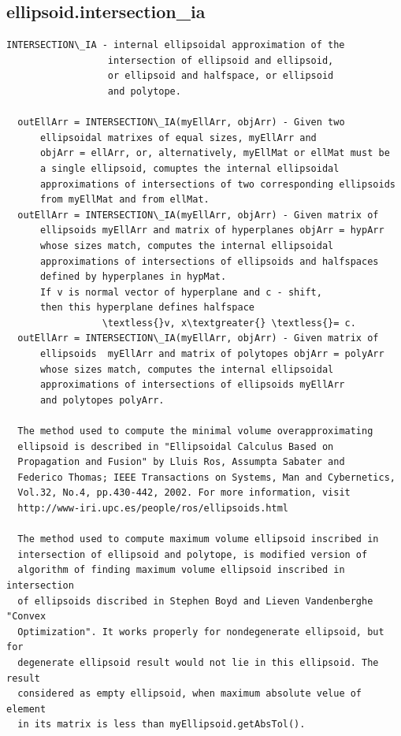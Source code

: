 \documentclass[letterpaper,10pt,english]{sphinxmanual}
\begin{document}
\subsection{ellipsoid.intersection\_ia}
\label{chap_functions:ellipsoid-intersection-ia}
\begin{Verbatim}[commandchars=\\\{\}]
INTERSECTION\_IA - internal ellipsoidal approximation of the
                  intersection of ellipsoid and ellipsoid,
                  or ellipsoid and halfspace, or ellipsoid
                  and polytope.

  outEllArr = INTERSECTION\_IA(myEllArr, objArr) - Given two
      ellipsoidal matrixes of equal sizes, myEllArr and
      objArr = ellArr, or, alternatively, myEllMat or ellMat must be
      a single ellipsoid, comuptes the internal ellipsoidal
      approximations of intersections of two corresponding ellipsoids
      from myEllMat and from ellMat.
  outEllArr = INTERSECTION\_IA(myEllArr, objArr) - Given matrix of
      ellipsoids myEllArr and matrix of hyperplanes objArr = hypArr
      whose sizes match, computes the internal ellipsoidal
      approximations of intersections of ellipsoids and halfspaces
      defined by hyperplanes in hypMat.
      If v is normal vector of hyperplane and c - shift,
      then this hyperplane defines halfspace
                 \textless{}v, x\textgreater{} \textless{}= c.
  outEllArr = INTERSECTION\_IA(myEllArr, objArr) - Given matrix of
      ellipsoids  myEllArr and matrix of polytopes objArr = polyArr
      whose sizes match, computes the internal ellipsoidal
      approximations of intersections of ellipsoids myEllArr
      and polytopes polyArr.

  The method used to compute the minimal volume overapproximating
  ellipsoid is described in "Ellipsoidal Calculus Based on
  Propagation and Fusion" by Lluis Ros, Assumpta Sabater and
  Federico Thomas; IEEE Transactions on Systems, Man and Cybernetics,
  Vol.32, No.4, pp.430-442, 2002. For more information, visit
  http://www-iri.upc.es/people/ros/ellipsoids.html

  The method used to compute maximum volume ellipsoid inscribed in
  intersection of ellipsoid and polytope, is modified version of
  algorithm of finding maximum volume ellipsoid inscribed in intersection
  of ellipsoids discribed in Stephen Boyd and Lieven Vandenberghe "Convex
  Optimization". It works properly for nondegenerate ellipsoid, but for
  degenerate ellipsoid result would not lie in this ellipsoid. The result
  considered as empty ellipsoid, when maximum absolute velue of element
  in its matrix is less than myEllipsoid.getAbsTol().


\end{Verbatim}
\end{document}
